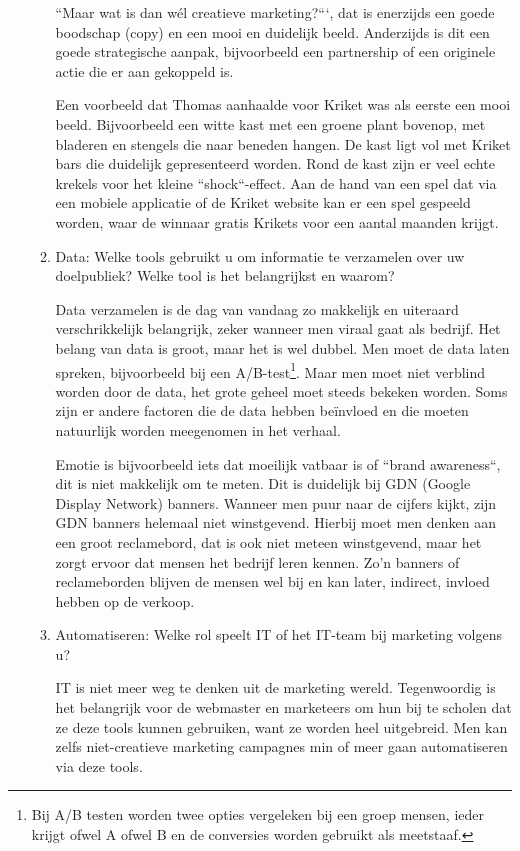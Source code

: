 \begin{itemize}
\begin{enumerate}[label*=\arabic*.]
		``Maar wat is dan wél creatieve marketing?```, dat is enerzijds een goede boodschap (copy) en een mooi en duidelijk beeld. Anderzijds is dit een goede strategische aanpak, bijvoorbeeld een partnership of een originele actie die er aan gekoppeld is.
		
		Een voorbeeld dat Thomas aanhaalde voor Kriket was als eerste een mooi beeld. Bijvoorbeeld een witte kast met een groene plant bovenop, met bladeren en stengels die naar beneden hangen. De kast ligt vol met Kriket bars die duidelijk gepresenteerd worden. Rond de kast zijn er veel echte krekels voor het kleine ``shock``-effect. Aan de hand van een spel dat via een mobiele applicatie of de Kriket website kan er een spel gespeeld worden, waar de winnaar gratis Krikets voor een aantal maanden krijgt.
		
		\item Data: Welke tools gebruikt u om informatie te verzamelen over uw doelpubliek? Welke tool is het belangrijkst en waarom?
		
		Data verzamelen is de dag van vandaag zo makkelijk en uiteraard verschrikkelijk belangrijk, zeker wanneer men viraal gaat als bedrijf. Het belang van data is groot, maar het is wel dubbel.
		Men moet de data laten spreken, bijvoorbeeld bij een A/B-test\footnote{Bij A/B testen worden twee opties vergeleken bij een groep mensen, ieder krijgt ofwel A ofwel B en de conversies worden gebruikt als meetstaaf.}. Maar men moet niet verblind worden door de data, het grote geheel moet steeds bekeken worden. Soms zijn er andere factoren die de data hebben beïnvloed en die moeten natuurlijk worden meegenomen in het verhaal.
		
		Emotie is bijvoorbeeld iets dat moeilijk vatbaar is of ``brand awareness``, dit is niet makkelijk om te meten. Dit is duidelijk bij GDN (Google Display Network) banners. Wanneer men puur naar de cijfers kijkt, zijn GDN banners helemaal niet winstgevend. Hierbij moet men denken aan een groot reclamebord, dat is ook niet meteen winstgevend, maar het zorgt ervoor dat mensen het bedrijf leren kennen. Zo'n banners of reclameborden blijven de mensen wel bij en kan later, indirect, invloed hebben op de verkoop.
		
		\item Automatiseren: Welke rol speelt IT of het IT-team bij marketing volgens u? 
		
		IT is niet meer weg te denken uit de marketing wereld. Tegenwoordig is het belangrijk voor de webmaster en marketeers om hun bij te scholen dat ze deze tools kunnen gebruiken, want ze worden heel uitgebreid. Men kan zelfs niet-creatieve marketing campagnes min of meer gaan automatiseren via deze tools. 
		

\end{enumerate}
\end{itemize}
